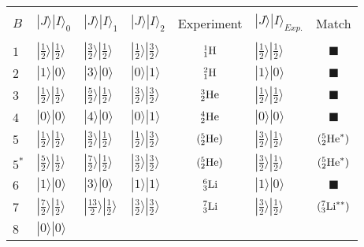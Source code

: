 \documentclass[a4paper,12pt]{article}
\begin{document}
\begin{table}[!htb]
\begin{center}
\begin{tabular}
{|l|l|l|l||c|l||c|}
\hline
& & & & & &\\
$B$ & 
$|J\rangle |I \rangle_{0}$ 
& $ | J\rangle | I\rangle_{1}$ 
& $ | J\rangle | I\rangle_{2}$ 
& Experiment &
$|J\rangle |I \rangle_{Exp.}$ 
& Match \\
& & & & & & \\
\hline
$1$ & 
$|\frac{1}{2} \rangle |\frac{1}{2} \rangle$ &
$|\frac{3}{2} \rangle |\frac{1}{2} \rangle$ &
$|\frac{1}{2} \rangle |\frac{3}{2} \rangle$ &
${}^1_1{\rm H}$ & 
$|\frac{1}{2} \rangle |\frac{1}{2} \rangle$ & $\blacksquare$ \\
\hline
$2$& 
$| 1 \rangle | 0 \rangle$ &
$| 3 \rangle | 0 \rangle$ &
$| 0 \rangle | 1 \rangle$ &
${}^2_1 {\rm H}$  & 
$| 1 \rangle | 0 \rangle$ & $\blacksquare$ \\
\hline
$3$ & 
$| \frac{1}{2} \rangle | \frac{1}{2} \rangle$ &
$| \frac{5}{2} \rangle | \frac{1}{2} \rangle$ &
$| \frac{3}{2} \rangle | \frac{3}{2} \rangle$ & 
${}^3_2 {\rm He}$ &
$| \frac{1}{2} \rangle | \frac{1}{2} \rangle$ & $\blacksquare$ \\
\hline
$4$ & 
$| 0 \rangle | 0 \rangle$ &
$| 4 \rangle | 0 \rangle$ &
$| 0 \rangle | 1 \rangle$ & ${}^4_2{\rm He}$ & 
$| 0 \rangle | 0 \rangle$ & $\blacksquare$ \\
\hline
$5$ &
$| \frac{1}{2} \rangle | \frac{1}{2} \rangle$ & 
 $| \frac{3}{2} \rangle | \frac{1}{2} \rangle$ &
 $| \frac{1}{2} \rangle | \frac{3}{2} \rangle$ & 
$({}^5_2 {\rm He})$ & 
 $| \frac{3}{2} \rangle | \frac{1}{2} \rangle$ & 
$({}^5_2 {\rm He}^{*})$ \\
$5^*$ &
$| \frac{5}{2} \rangle | \frac{1}{2} \rangle$ & 
 $| \frac{7}{2} \rangle | \frac{1}{2} \rangle$ &
 $| \frac{3}{2} \rangle | \frac{3}{2} \rangle$ & 
$({}^5_2 {\rm He})$ & 
 $| \frac{3}{2} \rangle | \frac{1}{2} \rangle$ & 
$({}^5_2 {\rm He}^{*})$ \\
\hline
$6$ & 
$| 1 \rangle | 0 \rangle$ &
$| 3 \rangle | 0 \rangle$ &
$| 1 \rangle | 1 \rangle$ & 
${}^6_3 {\rm Li}$ & 
$| 1 \rangle | 0 \rangle$ & $\blacksquare$ \\
\hline
$7$ &
$| \frac{7}{2}\rangle | \frac{1}{2} \rangle$ 
& $| \frac{13}{2} \rangle | \frac{1}{2} \rangle$
& $| \frac{3}{2} \rangle | \frac{3}{2} \rangle$ &
${}^7_3 {\rm Li}$ & 
 $| \frac{3}{2} \rangle | \frac{1}{2} \rangle$ 
& 
$({}^7_3 {\rm Li}^{**})$ \\
\hline
$8$ & 
$| 0 \rangle | 0 \rangle$ &

\end{tabular}
\end{center}
\end{table}
\end{document}
